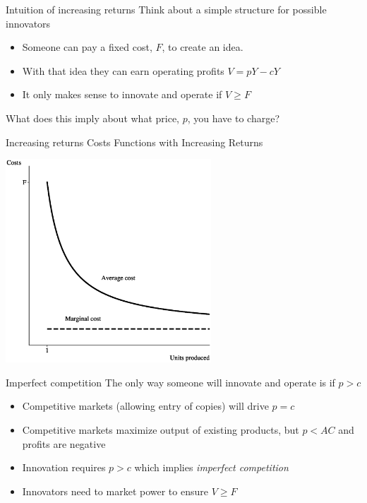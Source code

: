 \begin{frame}{Intuition of increasing returns}
Think about a simple structure for possible innovators
\begin{itemize}
	\item Someone can pay a fixed cost, $F$, to create an idea.
	\item With that idea they can earn operating profits $V = pY - cY$
	\item It only makes sense to innovate and operate if $V \geq F$
\end{itemize}
What does this imply about what price, $p$, you have to charge?
\end{frame}

\begin{frame}{Increasing returns}
Costs Functions with Increasing Returns
\begin{center}
\includegraphics[height = 3in]{../Figures/fig-ch4-fig5.eps}
\end{center}
\end{frame}

\begin{frame}{Imperfect competition}
The only way someone will innovate and operate is if $p > c$
\begin{itemize}
	\item Competitive markets (allowing entry of copies) will drive $p = c$
	\item Competitive markets maximize output of existing products, but $p < AC$ and profits are negative
	\item Innovation requires $p > c$ which implies \textit{imperfect competition}
	\item Innovators need to market power to ensure $V \geq F$
\end{itemize}
\end{frame}


